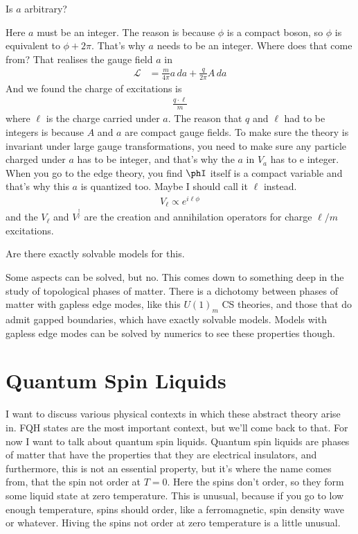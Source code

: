 \begin{question}
    Is $a$ arbitrary?
\end{question}
Here $a$ must be an integer.
The reason is because $\phi$ is a compact boson,
so $\phi$ is equivalent to $\phi + 2\pi$.
That's why $a$ needs to be an integer.
Where does that come from?
That realises the gauge field $a$ in
\begin{align}
    \mathcal{L} &=
    \frac{m}{4\pi} a\, da
    +
    \frac{q}{2\pi} A\, da
\end{align}
And we found the charge of excitations is
\begin{align}
    \frac{q\cdot \ell}{m}
\end{align}
where $\ell$ is the charge carried under $a$.
The reason that $q$ and $\ell$ had to be integers is because $A$ and $a$ are
compact gauge fields.
To make sure the theory is invariant under large gauge transformations,
you need to make sure any particle charged under $a$ has to be integer,
and that's why the $a$ in $V_a$ has to e integer.
When you go to the edge theory,
you  find $\phI$ itself is a compact variable and that's why this $a$ is
quantized too.
Maybe I should call it $\ell$ instead.
\begin{align}
    V_{\ell} \propto e^{i\ell \phi}
\end{align}
and the $V_{\ell}$ and $V^_\ell^\dagger$ are the creation and annihilation
operators for charge $\ell/m$ excitations.

\begin{question}
    Are there exactly solvable models for this.
\end{question}
Some aspects can be solved,
but no.
This comes down to something deep in the study of topological phases of matter.
There is a dichotomy between phases of matter with gapless edge modes,
like this $U(1)_m$ CS theories,
and those that do admit gapped boundaries,
which have exactly solvable models.
Models with gapless edge modes can be solved by numerics to see these properties
though.


\section{Quantum Spin Liquids}
I want to discuss various physical contexts in which these abstract theory arise
in.
FQH states are the most important context,
but we'll come back to that.
For now I want to talk about quantum spin liquids.
Quantum spin liquids are phases of matter that have the properties that they are
electrical insulators,
and furthermore,
this is not an essential property,
but it's where the name comes from,
that the spin not order at $T=0$.
Here the spins don't order,
so they form some liquid state at zero temperature.
This is unusual,
because if you go to low enough temperature,
spins should order,
like a ferromagnetic,
spin density wave or whatever.
Hiving the spins not order at zero temperature is a little unusual.

